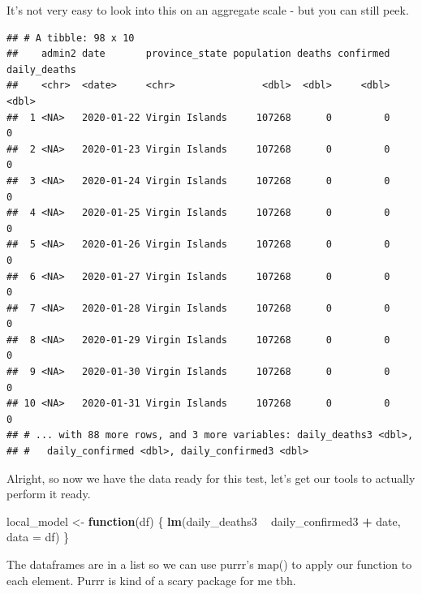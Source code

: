 \documentclass[
]{article}
\newenvironment{Shaded}{\begin{snugshade}}{\end{snugshade}}
\newcommand{\ControlFlowTok}[1]{\textcolor[rgb]{0.13,0.29,0.53}{\textbf{#1}}}
\newcommand{\DataTypeTok}[1]{\textcolor[rgb]{0.13,0.29,0.53}{#1}}
\newcommand{\DecValTok}[1]{\textcolor[rgb]{0.00,0.00,0.81}{#1}}
\newcommand{\KeywordTok}[1]{\textcolor[rgb]{0.13,0.29,0.53}{\textbf{#1}}}
\newcommand{\NormalTok}[1]{#1}
\newcommand{\OperatorTok}[1]{\textcolor[rgb]{0.81,0.36,0.00}{\textbf{#1}}}
\newcommand{\StringTok}[1]{\textcolor[rgb]{0.31,0.60,0.02}{#1}}
\begin{document}
It's not very easy to look into this on an aggregate scale - but you can
still peek.

\begin{Shaded}
\end{Shaded}

\begin{verbatim}
## # A tibble: 98 x 10
##    admin2 date       province_state population deaths confirmed daily_deaths
##    <chr>  <date>     <chr>               <dbl>  <dbl>     <dbl>        <dbl>
##  1 <NA>   2020-01-22 Virgin Islands     107268      0         0            0
##  2 <NA>   2020-01-23 Virgin Islands     107268      0         0            0
##  3 <NA>   2020-01-24 Virgin Islands     107268      0         0            0
##  4 <NA>   2020-01-25 Virgin Islands     107268      0         0            0
##  5 <NA>   2020-01-26 Virgin Islands     107268      0         0            0
##  6 <NA>   2020-01-27 Virgin Islands     107268      0         0            0
##  7 <NA>   2020-01-28 Virgin Islands     107268      0         0            0
##  8 <NA>   2020-01-29 Virgin Islands     107268      0         0            0
##  9 <NA>   2020-01-30 Virgin Islands     107268      0         0            0
## 10 <NA>   2020-01-31 Virgin Islands     107268      0         0            0
## # ... with 88 more rows, and 3 more variables: daily_deaths3 <dbl>,
## #   daily_confirmed <dbl>, daily_confirmed3 <dbl>
\end{verbatim}

Alright, so now we have the data ready for this test, let's get our
tools to actually perform it ready.

\begin{Shaded}
\begin{Highlighting}[]
\NormalTok{local_model <-}\StringTok{ }\ControlFlowTok{function}\NormalTok{(df) \{}
    \KeywordTok{lm}\NormalTok{(daily_deaths3 }\OperatorTok{~}\StringTok{ }\NormalTok{daily_confirmed3 }\OperatorTok{+}\StringTok{ }\NormalTok{date, }\DataTypeTok{data =}\NormalTok{ df)}
\NormalTok{\}}
\end{Highlighting}
\end{Shaded}

The dataframes are in a list so we can use purrr's map() to apply our
function to each element. Purrr is kind of a scary package for me tbh.
\end{document}
